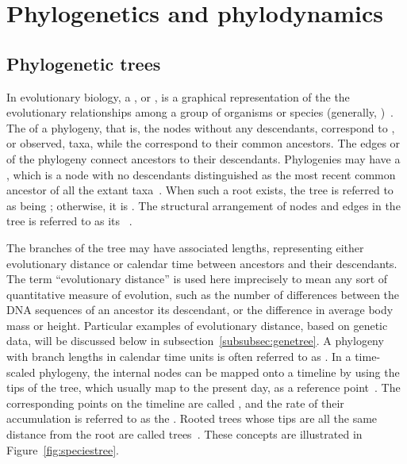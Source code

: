 \section{Phylogenetics and phylodynamics}

\subsection{Phylogenetic trees}

In evolutionary biology, a , or , is a
graphical representation of the the evolutionary relationships among a group of
organisms or species (generally, )~\autocite{haeckel1866generelle}.
The  of a phylogeny, that is, the nodes without any descendants,
correspond to , or observed, taxa, while the 
correspond to their common ancestors. The edges or  of the
phylogeny connect ancestors to their descendants. Phylogenies may have a
, which is a node with no descendants distinguished as the most
recent common ancestor of all the extant
taxa~\autocite{harding1971probabilities}. When such a root exists, the tree is
referred to as being ; otherwise, it is . The
structural arrangement of nodes and edges in the tree is referred to as its
~\autocite{cavalli1967phylogenetic}. 

The branches of the tree may have associated lengths, representing either
evolutionary distance or calendar time between ancestors and their descendants.
The term ``evolutionary distance'' is used here imprecisely to mean any sort of
quantitative measure of evolution, such as the number of differences between
the DNA sequences of an ancestor its descendant, or the difference in average
body mass or height. Particular examples of evolutionary distance, based on
genetic data, will be discussed below in subsection~\ref{subsubsec:genetree}. A
phylogeny with branch lengths in calendar time units is often referred to as
. In a time-scaled phylogeny, the internal nodes can be
mapped onto a timeline by using the tips of the tree, which usually map to the
present day, as a reference point~\autocite{nee1992tempo}. The corresponding
points on the timeline are called , and the rate of their
accumulation is referred to as the . Rooted trees whose
tips are all the same distance from the root are called 
trees~\autocite{buneman1974note}. These concepts are illustrated in
Figure~\ref{fig:speciestree}.


